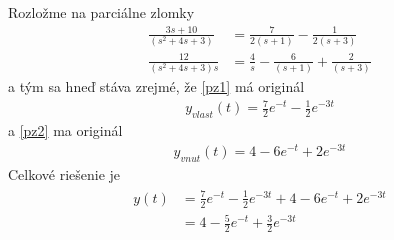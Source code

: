\documentclass[a4paper, 10pt, ]{article}
\begin{document}
Rozložme na parciálne zlomky
\begin{align}
    \frac{3s + 10}{\left( s^2   + 4s  + 3\right)} &= \frac{7}{2(s+1)} - \frac{1}{2(s+3)} \label{pz1} \\
    \frac{12}{\left( s^2   + 4s  + 3\right) s} &= \frac{4}{s} - \frac{6}{(s+1)} + \frac{2}{(s+3)} \label{pz2}
\end{align}
a tým sa hneď stáva zrejmé, že \eqref{pz1} má originál
\begin{align}
    y_{vlast}(t) = \frac{7}{2} e^{-t} - \frac{1}{2} e^{-3t}
\end{align}
a \eqref{pz2} ma originál
\begin{align}
    y_{vnut}(t) = 4 - 6 e^{-t} + 2 e^{-3t}
\end{align}
Celkové riešenie je
\begin{align}
    \begin{aligned}
        y(t) &= \frac{7}{2} e^{-t} - \frac{1}{2} e^{-3t} +  4 - 6 e^{-t} + 2 e^{-3t} \\
        &= 4 - \frac{5}{2} e^{-t} + \frac{3}{2} e^{-3t}
    \end{aligned}
\end{align}








\end{document}
